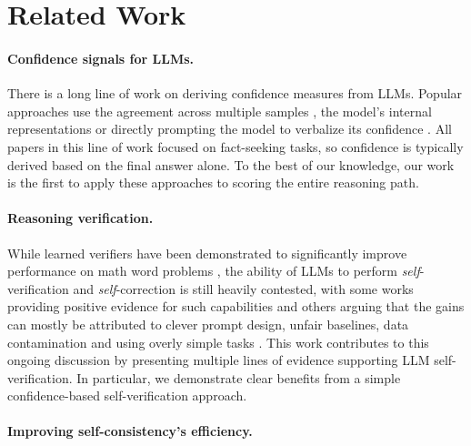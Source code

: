 \section{Related Work}

\paragraph{Confidence signals for LLMs.} 
There is a long line of work on deriving confidence measures from LLMs. Popular approaches use
the agreement across multiple samples \cite{kuhn2023semantic, manakul2023selfcheckgpt, tian2023fine,lyu2024calibrating}, the model's internal representations \cite{azaria2023internal, burns2022discovering} or directly prompting the model to verbalize its confidence \cite{tian2023just, kadavath2022language}.
All papers in this line of work focused on fact-seeking tasks, 
so confidence is typically derived based on the final answer alone. To the best of our knowledge, our work is the first to apply these approaches to scoring the entire reasoning path.

\paragraph{Reasoning verification.}
While learned verifiers have been demonstrated to significantly improve performance on math word problems \cite{cobbe2021training, lightman2023let, li2022making}, the ability of LLMs to perform \emph{self}-verification and \emph{self}-correction is still heavily contested, with some works providing positive evidence for such capabilities \cite{weng2022large, gero2023self, madaan2024self, liu2024large, li2024confidence} and others arguing that the gains can mostly be attributed to clever prompt design, unfair baselines, data contamination and using overly simple tasks \cite{tyen2023llms, valmeekam2023can, hong2023closer, huang2023large, stechly2024self, zhang2024small}. This work contributes to this ongoing discussion by presenting multiple lines of evidence supporting LLM self-verification. In particular, we demonstrate clear benefits from a simple confidence-based self-verification approach. 


\paragraph{Improving self-consistency's efficiency. }

